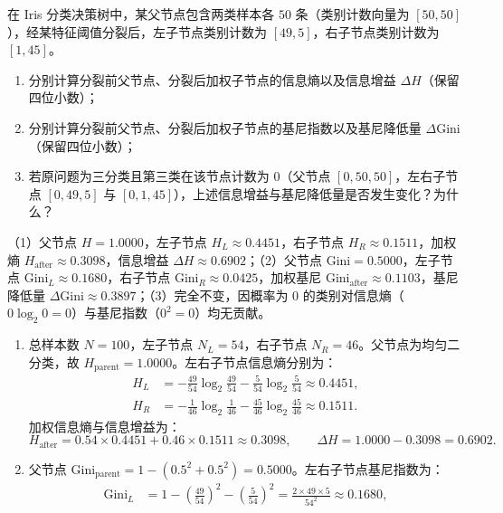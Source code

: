 \begin{exercise}[title={决策树节点分裂的熵增益与基尼增益手算},level=standard,points=15,tags={决策树,信息增益,基尼指数}]
在 Iris 分类决策树中，某父节点包含两类样本各 $50$ 条（类别计数向量为 $[50, 50]$），经某特征阈值分裂后，左子节点类别计数为 $[49, 5]$，右子节点类别计数为 $[1, 45]$。
\begin{enumerate}
  \item 分别计算分裂前父节点、分裂后加权子节点的信息熵以及信息增益 $\Delta H$（保留四位小数）；
  \item 分别计算分裂前父节点、分裂后加权子节点的基尼指数以及基尼降低量 $\Delta\mathrm{Gini}$（保留四位小数）；
  \item 若原问题为三分类且第三类在该节点计数为 $0$（父节点 $[0, 50, 50]$，左右子节点 $[0, 49, 5]$ 与 $[0, 1, 45]$），上述信息增益与基尼降低量是否发生变化？为什么？
\end{enumerate}
\begin{answer}
（1）父节点 $H=1.0000$，左子节点 $H_L \approx 0.4451$，右子节点 $H_R \approx 0.1511$，加权熵 $H_{\text{after}} \approx 0.3098$，信息增益 $\Delta H \approx 0.6902$；（2）父节点 $\mathrm{Gini}=0.5000$，左子节点 $\mathrm{Gini}_L \approx 0.1680$，右子节点 $\mathrm{Gini}_R \approx 0.0425$，加权基尼 $\mathrm{Gini}_{\text{after}} \approx 0.1103$，基尼降低量 $\Delta\mathrm{Gini} \approx 0.3897$；（3）完全不变，因概率为 $0$ 的类别对信息熵（$0\log_2 0 = 0$）与基尼指数（$0^2=0$）均无贡献。
\end{answer}
\begin{solution}
\begin{enumerate}
  \item 总样本数 $N=100$，左子节点 $N_L=54$，右子节点 $N_R=46$。父节点为均匀二分类，故 $H_{\text{parent}} = 1.0000$。左右子节点信息熵分别为：
  \[\begin{aligned}
    H_L &= -\frac{49}{54}\log_2\frac{49}{54} - \frac{5}{54}\log_2\frac{5}{54} \approx 0.4451,\\
    H_R &= -\frac{1}{46}\log_2\frac{1}{46} - \frac{45}{46}\log_2\frac{45}{46} \approx 0.1511.
  \end{aligned}\]
  加权信息熵与信息增益为：
  \[
    H_{\text{after}} = 0.54\times 0.4451 + 0.46\times 0.1511 \approx 0.3098,\qquad
    \Delta H = 1.0000 - 0.3098 = 0.6902.
  \]
  \item 父节点 $\mathrm{Gini}_{\text{parent}} = 1 - (0.5^2 + 0.5^2) = 0.5000$。左右子节点基尼指数为：
  \[\begin{aligned}
    \mathrm{Gini}_L &= 1 - \left(\frac{49}{54}\right)^2 - \left(\frac{5}{54}\right)^2 = \frac{2\times 49\times 5}{54^2} \approx 0.1680,\\

\end{aligned}\]
\end{enumerate}
\end{solution}
\end{exercise}
